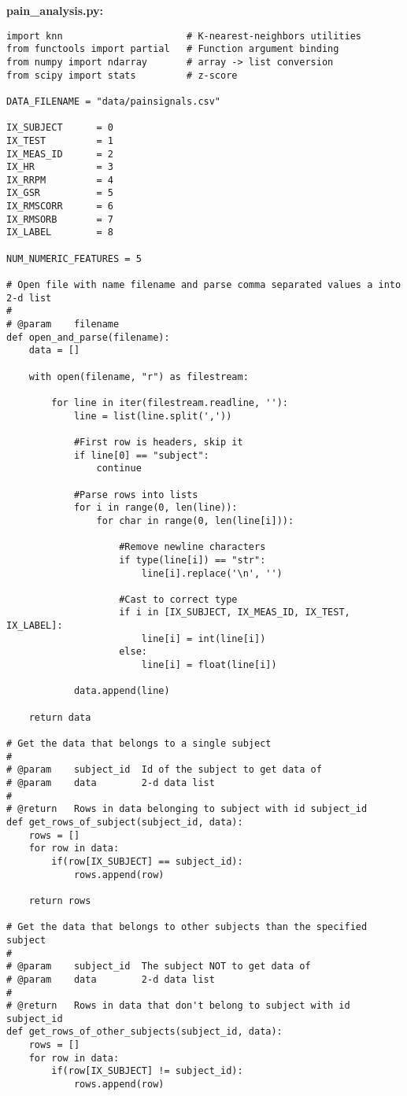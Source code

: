 \documentclass[a4paper]{article}
\begin{document}
\textbf{pain\_analysis.py:}\\
\footnotesize
\begin{lstlisting}
import knn                      # K-nearest-neighbors utilities
from functools import partial   # Function argument binding
from numpy import ndarray       # array -> list conversion
from scipy import stats         # z-score

DATA_FILENAME = "data/painsignals.csv"

IX_SUBJECT      = 0
IX_TEST         = 1
IX_MEAS_ID      = 2
IX_HR           = 3
IX_RRPM         = 4
IX_GSR          = 5
IX_RMSCORR      = 6
IX_RMSORB       = 7
IX_LABEL        = 8

NUM_NUMERIC_FEATURES = 5

# Open file with name filename and parse comma separated values a into 2-d list
#
# @param    filename
def open_and_parse(filename):
    data = []

    with open(filename, "r") as filestream:

        for line in iter(filestream.readline, ''):
            line = list(line.split(','))

            #First row is headers, skip it
            if line[0] == "subject":
                continue

            #Parse rows into lists
            for i in range(0, len(line)):
                for char in range(0, len(line[i])):

                    #Remove newline characters
                    if type(line[i]) == "str":
                        line[i].replace('\n', '')

                    #Cast to correct type
                    if i in [IX_SUBJECT, IX_MEAS_ID, IX_TEST, IX_LABEL]:
                        line[i] = int(line[i])
                    else:
                        line[i] = float(line[i])

            data.append(line)

    return data

# Get the data that belongs to a single subject 
#
# @param    subject_id  Id of the subject to get data of
# @param    data        2-d data list
#
# @return   Rows in data belonging to subject with id subject_id
def get_rows_of_subject(subject_id, data):
    rows = []
    for row in data:
        if(row[IX_SUBJECT] == subject_id):
            rows.append(row)

    return rows

# Get the data that belongs to other subjects than the specified subject
#
# @param    subject_id  The subject NOT to get data of
# @param    data        2-d data list
#
# @return   Rows in data that don't belong to subject with id subject_id
def get_rows_of_other_subjects(subject_id, data):
    rows = []
    for row in data:
        if(row[IX_SUBJECT] != subject_id):
            rows.append(row)


\end{lstlisting}
\end{document}
